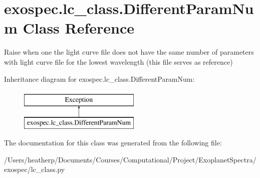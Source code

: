 \hypertarget{classexospec_1_1lc__class_1_1_different_param_num}{}\section{exospec.\+lc\+\_\+class.\+Different\+Param\+Num Class Reference}
\label{classexospec_1_1lc__class_1_1_different_param_num}


Raise when one the light curve file does not have the same number of parameters with light curve file for the lowest wavelength (this file serves as reference)  


Inheritance diagram for exospec.\+lc\+\_\+class.\+Different\+Param\+Num\+:\begin{figure}[H]
\begin{center}
\leavevmode
\includegraphics[height=2.000000cm]{classexospec_1_1lc__class_1_1_different_param_num}
\end{center}
\end{figure}


The documentation for this class was generated from the following file\+:\begin{DoxyCompactItemize}
\item 
/\+Users/heatherp/\+Documents/\+Courses/\+Computational/\+Project/\+Exoplanet\+Spectra/exospec/lc\+\_\+class.\+py\end{DoxyCompactItemize}

